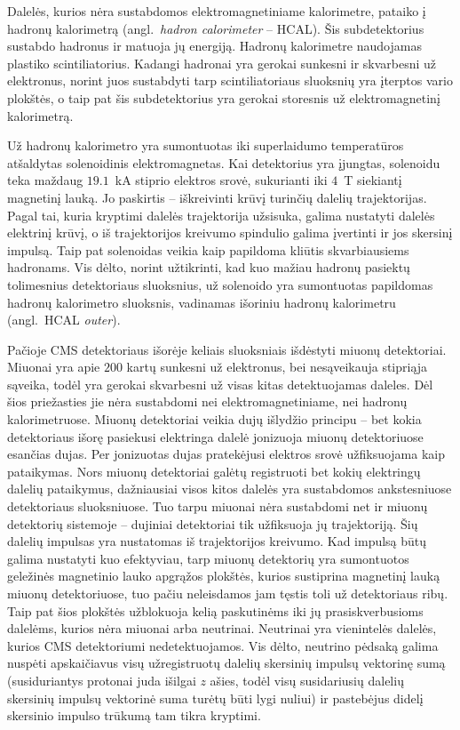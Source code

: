 \documentclass[a4paper, 12pt, oneside]{article}
\begin{document}
Dalelės, kurios nėra sustabdomos elektromagnetiniame kalorimetre, pataiko į hadronų kalorimetrą (angl.\ \textit{hadron calorimeter} -- HCAL).
Šis subdetektorius sustabdo hadronus ir matuoja jų energiją.
Hadronų kalorimetre naudojamas plastiko scintiliatorius.
Kadangi hadronai yra gerokai sunkesni ir skvarbesni už elektronus, norint juos sustabdyti tarp scintiliatoriaus sluoksnių yra įterptos
vario plokštės, o taip pat šis subdetektorius yra gerokai storesnis už elektromagnetinį kalorimetrą.

Už hadronų kalorimetro yra sumontuotas iki superlaidumo temperatūros atšaldytas solenoidinis elektromagnetas.
Kai detektorius yra įjungtas, solenoidu teka maždaug $19.1$~kA stiprio elektros srovė, sukurianti iki $4$~T siekiantį magnetinį lauką.
Jo paskirtis -- iškreivinti krūvį turinčių dalelių trajektorijas.
Pagal tai, kuria kryptimi dalelės trajektorija užsisuka, galima nustatyti dalelės elektrinį krūvį,
o iš trajektorijos kreivumo spindulio galima įvertinti ir jos skersinį impulsą.
Taip pat solenoidas veikia kaip papildoma kliūtis skvarbiausiems hadronams.
Vis dėlto, norint užtikrinti, kad kuo mažiau hadronų pasiektų tolimesnius detektoriaus sluoksnius, už
solenoido yra sumontuotas papildomas hadronų kalorimetro sluoksnis, vadinamas išoriniu hadronų kalorimetru
(angl.\ HCAL \textit{outer}).

Pačioje CMS detektoriaus išorėje keliais sluoksniais išdėstyti miuonų detektoriai.
Miuonai yra apie $200$ kartų sunkesni už elektronus, bei nesąveikauja stipriąja sąveika, todėl yra gerokai skvarbesni
už visas kitas detektuojamas daleles.
Dėl šios priežasties jie nėra sustabdomi nei elektromagnetiniame, nei hadronų kalorimetruose.
Miuonų detektoriai veikia dujų išlydžio principu -- bet kokia detektoriaus išorę pasiekusi elektringa dalelė jonizuoja
miuonų detektoriuose esančias dujas.
Per jonizuotas dujas pratekėjusi elektros srovė užfiksuojama kaip pataikymas.
Nors miuonų detektoriai galėtų registruoti bet kokių elektringų dalelių pataikymus, dažniausiai visos
kitos dalelės yra sustabdomos ankstesniuose detektoriaus sluoksniuose.
Tuo tarpu miuonai nėra sustabdomi net ir miuonų detektorių sistemoje -- dujiniai detektoriai tik užfiksuoja jų
trajektoriją.
Šių dalelių impulsas yra nustatomas iš trajektorijos kreivumo.
Kad impulsą būtų galima nustatyti kuo efektyviau, tarp miuonų detektorių yra sumontuotos geležinės magnetinio
lauko apgrąžos plokštės, kurios sustiprina magnetinį lauką miuonų detektoriuose, tuo pačiu neleisdamos jam tęstis toli
už detektoriaus ribų.
Taip pat šios plokštės užblokuoja kelią paskutinėms iki jų prasiskverbusioms dalelėms, kurios nėra miuonai
arba neutrinai.
Neutrinai yra vienintelės dalelės, kurios CMS detektoriumi nedetektuojamos.
Vis dėlto, neutrino pėdsaką galima nuspėti apskaičiavus visų užregistruotų dalelių skersinių impulsų vektorinę sumą
(susiduriantys protonai juda išilgai $z$ ašies, todėl visų susidariusių dalelių skersinių impulsų vektorinė suma turėtų
būti lygi nuliui) ir pastebėjus didelį skersinio impulso trūkumą tam tikra kryptimi.
\end{document}
